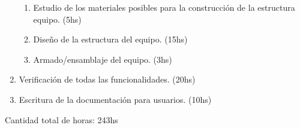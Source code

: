 \begin{enumerate}
  \begin{enumerate}
    \item Estudio de los materiales posibles para la construcción de la estructura equipo. (5hs)
    \item Diseño de la estructura del equipo. (15hs)
    \item Armado/ensamblaje del equipo. (3hs)
  \end{enumerate}
  \item Verificación de todas las funcionalidades. (20hs)
  \item Escritura de la documentación para usuarios. (10hs)
\end{enumerate}

Cantidad total de horas: 243hs